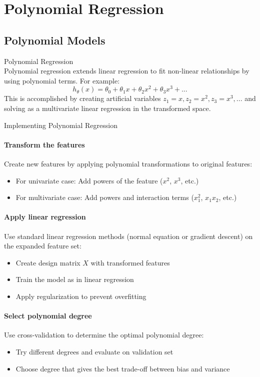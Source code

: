 \section{Polynomial Regression}

\subsection{Polynomial Models}

\begin{definition}{Polynomial Regression}\\
Polynomial regression extends linear regression to fit non-linear relationships by using polynomial terms. For example:
\[h_\theta(x) = \theta_0 + \theta_1 x + \theta_2 x^2 + \theta_3 x^3 + ...\]
This is accomplished by creating artificial variables $z_1 = x, z_2 = x^2, z_3 = x^3,...$ and solving as a multivariate linear regression in the transformed space.
\end{definition}

\begin{KR}{Implementing Polynomial Regression}\\
\paragraph{Transform the features}
Create new features by applying polynomial transformations to original features:
\begin{itemize}
    \item For univariate case: Add powers of the feature ($x^2$, $x^3$, etc.)
    \item For multivariate case: Add powers and interaction terms ($x_1^2$, $x_1x_2$, etc.)
\end{itemize}

\paragraph{Apply linear regression}
Use standard linear regression methods (normal equation or gradient descent) on the expanded feature set:
\begin{itemize}
    \item Create design matrix $X$ with transformed features
    \item Train the model as in linear regression
    \item Apply regularization to prevent overfitting
\end{itemize}

\paragraph{Select polynomial degree}
Use cross-validation to determine the optimal polynomial degree:
\begin{itemize}
    \item Try different degrees and evaluate on validation set
    \item Choose degree that gives the best trade-off between bias and variance
\end{itemize}
\end{KR}

